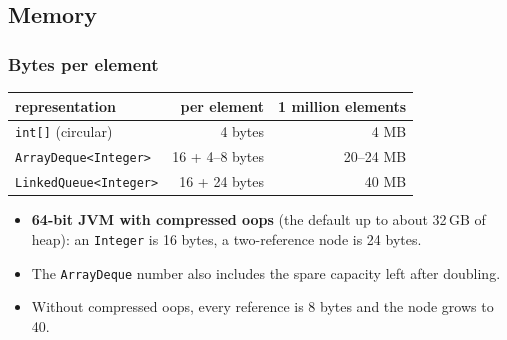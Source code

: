 \documentclass[aspectratio=169,10pt,compress]{beamer}
\begin{document}
\subsection[Memory]{Memory}




\begin{frame}[t,fragile] \frametitle{Bytes per element}
  \begin{center}\small
  \begin{tabular}{@{}lrr@{}}
    \toprule
    \textbf{representation} & \textbf{per element} & \textbf{1 million elements} \\
    \midrule
    \texttt{int[]} (circular)            & 4 bytes            & 4 MB \\
    \texttt{ArrayDeque<Integer>}          & 16 + 4--8 bytes    & 20--24 MB \\
    \texttt{LinkedQueue<Integer>}         & 16 + 24 bytes      & 40 MB \\
    \bottomrule
  \end{tabular}
  \end{center}
  \vspace{0.5em}
  \begin{itemize}\small
    \item \textbf{64-bit JVM with compressed oops} (the default up to about 32\,GB of heap):
          an \texttt{Integer} is 16 bytes, a two-reference node is 24 bytes.
    \item The \texttt{ArrayDeque} number also includes the spare capacity left after doubling.
    \item Without compressed oops, every reference is 8 bytes and the node grows to 40.
  \end{itemize}
\end{frame}
\end{document}
